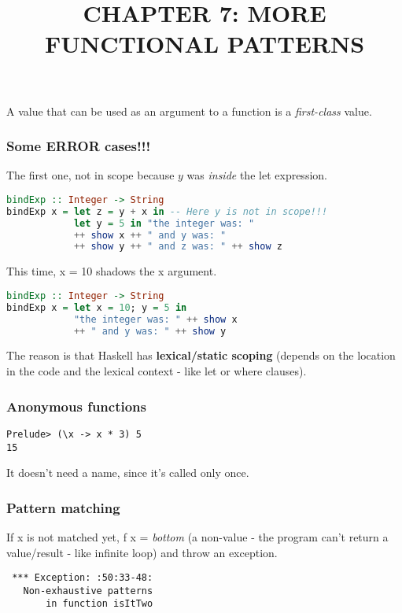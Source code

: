 \documentclass{article}
\title{CHAPTER 7: MORE FUNCTIONAL PATTERNS}
\date{}
\author{}
\begin{document}
  \maketitle
    A value that can be used as an argument to a function is a \textit{first-class} value.

    \subsubsection*{Some ERROR cases!!!}
   The first one, not in scope because $y$ was \textit{inside} the {\selectfont let} expression. 
    \begin{lstlisting}[language = Haskell]
bindExp :: Integer -> String
bindExp x = let z = y + x in -- Here y is not in scope!!!
            let y = 5 in "the integer was: "
            ++ show x ++ " and y was: "
            ++ show y ++ " and z was: " ++ show z \end{lstlisting}
This time, {\selectfont x = 10} shadows the {\selectfont x} argument.
            \begin{lstlisting}[language = Haskell]
bindExp :: Integer -> String
bindExp x = let x = 10; y = 5 in
            "the integer was: " ++ show x
            ++ " and y was: " ++ show y 
\end{lstlisting}
    The reason is that Haskell has \textbf{lexical/static scoping} (depends on the location in the code and the lexical context - like {\selectfont let} or {\selectfont where} clauses).

\subsubsection*{Anonymous functions}
\begin{minipage}[]{0.3\linewidth}
\begin{lstlisting}
Prelude> (\x -> x * 3) 5
15
\end{lstlisting}    
  \end{minipage}\hfill
\begin{minipage}[]{0.65\linewidth}
 It doesn't need a name, since it's called only once.
\end{minipage}


\begin{minipage}[]{0.65\linewidth}
\subsubsection*{Pattern matching}

If {\selectfont x} is not matched yet, {\selectfont f x = } \emph{bottom} (a non-value - the program can't return a value/result - like infinite loop) and throw an exception.

    \end{minipage}\hfill
    \begin{minipage}[]{0.3\linewidth}
\begin{lstlisting}
 *** Exception: :50:33-48:
   Non-exhaustive patterns
       in function isItTwo
\end{lstlisting}
    \end{minipage}
\end{document}
